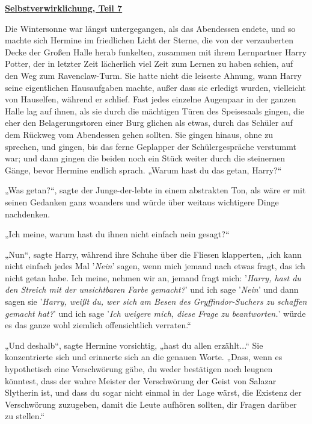 

\hypertarget{selbstverwirklichung-teil-7}{%

\textbf{\uline{Selbstverwirklichung, Teil 7}}

\hfill\break Die Wintersonne war längst untergegangen, als das Abendessen endete, und so machte sich Hermine im friedlichen Licht der Sterne, die von der verzauberten Decke der Großen Halle herab funkelten, zusammen mit ihrem Lernpartner Harry Potter, der in letzter Zeit lächerlich viel Zeit zum Lernen zu haben schien, auf den Weg zum Ravenclaw-Turm. Sie hatte nicht die leiseste Ahnung, wann Harry seine eigentlichen Hausaufgaben machte, außer dass sie erledigt wurden, vielleicht von Hauselfen, während er schlief. Fast jedes einzelne Augenpaar in der ganzen Halle lag auf ihnen, als sie durch die mächtigen Türen des Speisesaals gingen, die eher den Belagerungstoren einer Burg glichen als etwas, durch das Schüler auf dem Rückweg vom Abendessen gehen sollten. Sie gingen hinaus, ohne zu sprechen, und gingen, bis das ferne Geplapper der Schülergespräche verstummt war; und dann gingen die beiden noch ein Stück weiter durch die steinernen Gänge, bevor Hermine endlich sprach. „Warum hast du das getan, Harry?“

„Was getan?“, sagte der Junge-der-lebte in einem abstrakten Ton, als wäre er mit seinen Gedanken ganz woanders und würde über weitaus wichtigere Dinge nachdenken.

„Ich meine, warum hast du ihnen nicht einfach nein gesagt?“

„Nun“, sagte Harry, während ihre Schuhe über die Fliesen klapperten, „ich kann nicht einfach jedes Mal '\emph{Nein}' sagen, wenn mich jemand nach etwas fragt, das ich nicht getan habe. Ich meine, nehmen wir an, jemand fragt mich: '\emph{Harry, hast du den Streich mit der unsichtbaren Farbe gemacht?}' und ich sage '\emph{Nein}' und dann sagen sie '\emph{Harry, weißt du, wer sich am Besen des Gryffindor-Suchers zu schaffen gemacht hat?}' und ich sage '\emph{Ich weigere mich, diese Frage zu beantworten.}' würde es das ganze wohl ziemlich offensichtlich verraten.“

„Und deshalb“, sagte Hermine vorsichtig, „hast du allen erzählt...“ Sie konzentrierte sich und erinnerte sich an die genauen Worte. „Dass, wenn es hypothetisch eine Verschwörung gäbe, du weder bestätigen noch leugnen könntest, dass der wahre Meister der Verschwörung der Geist von Salazar Slytherin ist, und dass du sogar nicht einmal in der Lage wärst, die Existenz der Verschwörung zuzugeben, damit die Leute aufhören sollten, dir Fragen darüber zu stellen.“

}
